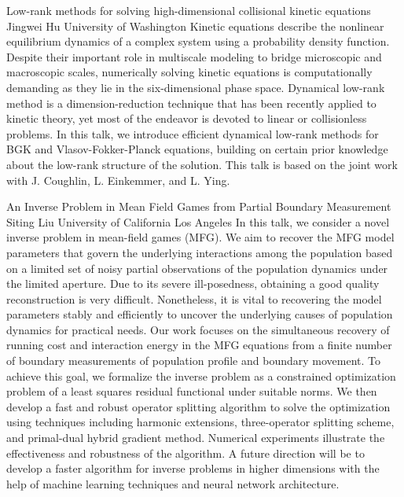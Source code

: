 \vspace{1.5ex}
\abs
{Low-rank methods for solving high-dimensional collisional kinetic equations}
{Jingwei Hu}
{University of Washington}
{Kinetic equations describe the nonlinear equilibrium dynamics of a complex system using a probability density function. Despite their important role in multiscale modeling to bridge microscopic and macroscopic scales, numerically solving kinetic equations is computationally demanding as they lie in the six-dimensional phase space. Dynamical low-rank method is a dimension-reduction technique that has been recently applied to kinetic theory, yet most of the endeavor is devoted to linear or collisionless problems. In this talk, we introduce efficient dynamical low-rank methods for BGK and Vlasov-Fokker-Planck equations, building on certain prior knowledge about the low-rank structure of the solution. This talk is based on the joint work with J. Coughlin, L. Einkemmer, and L. Ying.}


\vspace{1.5ex}
\abs
{An Inverse Problem in Mean Field Games from Partial Boundary Measurement}
{Siting Liu}
{University of California Los Angeles}
{In this talk, we consider a novel inverse problem in mean-field games (MFG). We aim to recover the MFG model parameters that govern the underlying interactions among the population based on a limited set of noisy partial observations of the population dynamics under the limited aperture. Due to its severe ill-posedness, obtaining a good quality reconstruction is very difficult. Nonetheless, it is vital to recovering the model parameters stably and efficiently to uncover the underlying causes of population dynamics for practical needs.
	Our work focuses on the simultaneous recovery of running cost and interaction energy in the MFG equations from a finite number of boundary measurements of population profile and boundary movement. To achieve this goal, we formalize the inverse problem as a constrained optimization problem of a least squares residual functional under suitable norms. We then develop a fast and robust operator splitting algorithm to solve the optimization using techniques including harmonic extensions, three-operator splitting scheme, and primal-dual hybrid gradient method. Numerical experiments illustrate the effectiveness and robustness of the algorithm.
	A future direction will be to develop a faster algorithm for inverse problems in higher dimensions with the help of machine learning techniques and neural network architecture.}


